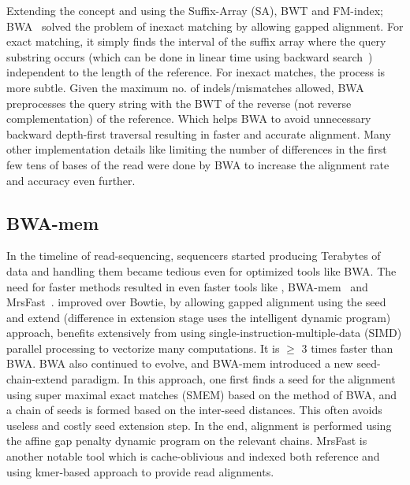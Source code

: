 Extending the concept and using the Suffix-Array (SA), BWT and FM-index; BWA~\citep{bwa} solved the problem of inexact matching by allowing gapped alignment. For exact matching, it simply finds the interval of the suffix array where the query substring occurs (which can be done in linear time using backward search~\citep{ferragina2000opportunistic}) independent to the length of the reference. For inexact matches, the process is more subtle. Given the maximum no. of indels/mismatches allowed, BWA preprocesses the query string with the BWT of the reverse (not reverse complementation) of the reference. Which helps BWA to avoid unnecessary backward depth-first traversal resulting in faster and accurate alignment. Many other implementation details like limiting the number of differences in the first few tens of bases of the read were done by BWA to increase the alignment rate and accuracy even further.


\subsection{BWA-mem~\citep{bwamem}} \label{bwa-mem}

In the timeline of read-sequencing, sequencers started producing Terabytes of data and handling them became tedious even for optimized tools like BWA. The need for faster methods resulted in even faster tools like \bt, BWA-mem~\citep{bwamem} and MrsFast~\citep{mrsfast}. \bt improved over Bowtie, by allowing gapped alignment using the seed and extend (difference in extension stage uses the intelligent dynamic program) approach, \bt benefits extensively from using single-instruction-multiple-data (SIMD) parallel processing to vectorize many computations. It is $\geq$ 3 times faster than BWA. BWA also continued to evolve, and BWA-mem introduced a new seed-chain-extend paradigm. In this approach, one first finds a seed for the alignment using super maximal exact matches (SMEM) based on the method of BWA, and a chain of seeds is formed based on the inter-seed distances. This often avoids useless and costly seed extension step. In the end, alignment is performed using the affine gap penalty dynamic program on the relevant chains. MrsFast is another notable tool which is cache-oblivious and indexed both reference and \reads using kmer-based approach to provide read alignments.

\begin{figure*}
 \centering
 \texttt{[image: rapmap/\{Avi.RPE.fig.5]}.png}
  \caption{From Top to bottom~\citep{altfigure}. : DNA, RNA and mRNA.}
  \label{fig:alt-splicing}
\end{figure*}

